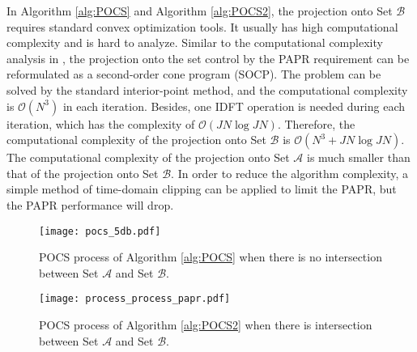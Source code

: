 \documentclass[paper]{ieice}
\begin{document}
In Algorithm \ref{alg:POCS} and Algorithm \ref{alg:POCS2}, the projection onto Set $\mathcal{B}$ requires standard convex optimization tools.  It usually has high computational complexity and is hard to analyze. Similar to the computational complexity analysis in \cite{wang2011optimized,ni2015joint}, the projection onto the set control by the PAPR requirement can be reformulated as a second-order cone program (SOCP). The problem can be solved by the standard
interior-point method, and the computational complexity is $\mathcal{O}(N^3)$ in each
iteration. Besides, one IDFT operation is needed during each iteration, which has the complexity of $\mathcal{O}(JN \log JN)$.
Therefore, the computational complexity of the projection onto Set $\mathcal{B}$ is $\mathcal{O}(N^3 + JN \log JN)$. The computational complexity of the projection onto Set $\mathcal{A}$ is much smaller than that of the projection onto Set $\mathcal{B}$.  In order to reduce the algorithm complexity, a simple method of time-domain clipping can be applied to limit the PAPR, but the PAPR performance will drop.

 


\begin{figure}[t]
\begin{center}
\texttt{[image: pocs\_5db.pdf]}
\end{center}
\caption{POCS process of Algorithm \ref{alg:POCS} when there is no intersection between Set $\mathcal{A}$ and Set $\mathcal{B}$.}
\label{fig:pocs_no_interection}
\end{figure}




\begin{figure}[t]
	\begin{center}
	\texttt{[image: process\_process\_papr.pdf]}
      \end{center}
	\caption{POCS process of Algorithm \ref{alg:POCS2} when there is intersection between Set $\mathcal{A}$ and Set $\mathcal{B}$.}
	\label{fig:pocs_nointersection_papr}
\end{figure}
\end{document}
